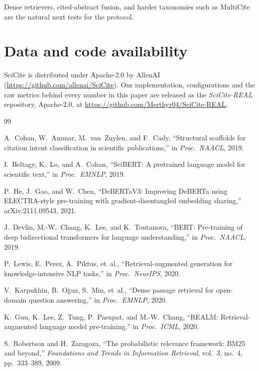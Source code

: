 \documentclass[10pt,twocolumn,twoside]{article}
\begin{document}
Dense retrievers, cited-abstract fusion, and harder taxonomies such as
MultiCite are the natural next tests for the protocol.

\section*{Data and code availability}
SciCite is distributed under Apache-2.0 by AllenAI
(\url{https://github.com/allenai/SciCite}). Our implementation,
configurations and the raw metrics behind every number in this paper are
released as the \emph{SciCite-REAL} repository, Apache-2.0, at
\url{https://github.com/Merthyr04/SciCite-REAL}.

\begin{thebibliography}{99}

 A.~Cohan, W.~Ammar, M.~van~Zuylen, and F.~Cady,
``Structural scaffolds for citation intent classification in scientific
publications,'' in \emph{Proc.\ NAACL}, 2019.

 I.~Beltagy, K.~Lo, and A.~Cohan, ``SciBERT: A
pretrained language model for scientific text,'' in \emph{Proc.\ EMNLP},
2019.

 P.~He, J.~Gao, and W.~Chen, ``DeBERTaV3: Improving DeBERTa
using ELECTRA-style pre-training with gradient-disentangled embedding
sharing,'' arXiv:2111.09543, 2021.

 J.~Devlin, M.-W.~Chang, K.~Lee, and K.~Toutanova,
``BERT: Pre-training of deep bidirectional transformers for language
understanding,'' in \emph{Proc.\ NAACL}, 2019.

 P.~Lewis, E.~Perez, A.~Piktus, et~al.,
``Retrieval-augmented generation for knowledge-intensive NLP tasks,'' in
\emph{Proc.\ NeurIPS}, 2020.

 V.~Karpukhin, B.~O\u{g}uz, S.~Min, et~al., ``Dense
passage retrieval for open-domain question answering,'' in \emph{Proc.\
EMNLP}, 2020.

 K.~Guu, K.~Lee, Z.~Tung, P.~Pasupat, and M.-W.~Chang,
``REALM: Retrieval-augmented language model pre-training,'' in \emph{Proc.\
ICML}, 2020.

 S.~Robertson and H.~Zaragoza, ``The probabilistic
relevance framework: BM25 and beyond,'' \emph{Foundations and Trends in
Information Retrieval}, vol.~3, no.~4, pp.~333--389, 2009.


\end{thebibliography}
\end{document}
